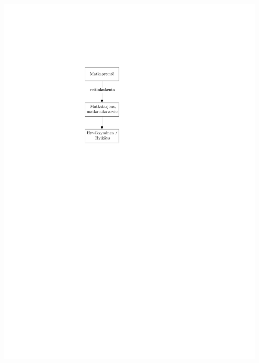 \documentclass{beamer}
\begin{document}
\begin{frame}
\begin{columns}[c]
\includegraphics[scale=0.8]{tilauskaavio02}
 
  \end{columns}
\end{frame}
\end{document}
